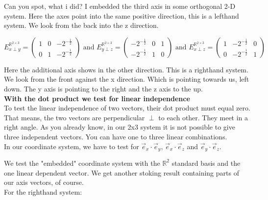 \documentclass[a4paper]{article}
\begin{document}
\begin{Example}
\begin{PropositionOpt4}
Can you spot, what i did? I embedded the third axis in some orthogonal 2-D system. Here the axes point into the same positive direction, this is a lefthand system. We look from the back into the z direction.


\begin{displaymath}
    E^{\mathbb{R}^{2\times{3}}}_{x\perp y} = \begin{pmatrix}1&0&-2^{-\frac12}\\0&1&-2^{-\frac12}\end{pmatrix} \mbox{ and }
    E^{\mathbb{R}^{2\times{3}}}_{y\perp z} = \begin{pmatrix}-2^{-\frac12}&0&1\\-2^{-\frac12}&1&0\end{pmatrix} \mbox{ and }
    E^{\mathbb{R}^{2\times{3}}}_{x\perp z} = \begin{pmatrix}1&-2^{-\frac12}&0\\0&-2^{-\frac12}&1\end{pmatrix} 
\end{displaymath}

Here the additional axis shows in the other direction. This is a righthand system. We look from the front against the x direction.
Which is pointing towards us, left down. The y axis is pointing to the right and the z axis to the up.\\

\textbf{With the dot product we test for linear independence}\\

To test the linear independence of two vectors, their dot product must equal zero.\\
That means, the two vectors are perpendicular $\perp$ to each other. They meet in a right angle. As you already know, 
in our 2x3 system it is not possible to give three independent vectors. You can have one to three linear combinations.\\


In our coordinate system, we have to test for $\vec{e}_{x}\cdot\vec{e}_{y}$, $\vec{e}_{x}\cdot\vec{e}_{z}$ and $\vec{e}_{y}\cdot\vec{e}_{z}$.

We test the "embedded" coordinate system with the $\mathbb{R}^{2}$ standard basis and the one linear dependent vector. We 
get another stoking result containing parts of our axis vectors, of course.\\

For the righthand system:\\


\end{PropositionOpt4}
\end{Example}
\end{document}
